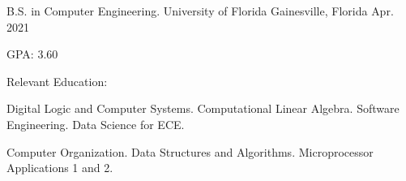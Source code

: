 


\begin{cventries}


\cventry
{B.S. in Computer Engineering.} %
{University of Florida} %
{Gainesville, Florida} %
{Apr. 2021} %
{ %
\begin{cvitems}
\item {GPA: 3.60}
\item Relevant Education:
\setlength{\itemindent}{.125in}
\item {Digital Logic and Computer Systems. Computational Linear Algebra. Software Engineering. Data Science for ECE.}
\item {Computer Organization. Data Structures and Algorithms. Microprocessor Applications 1 and 2.}
\end{cvitems}
}


\end{cventries}
